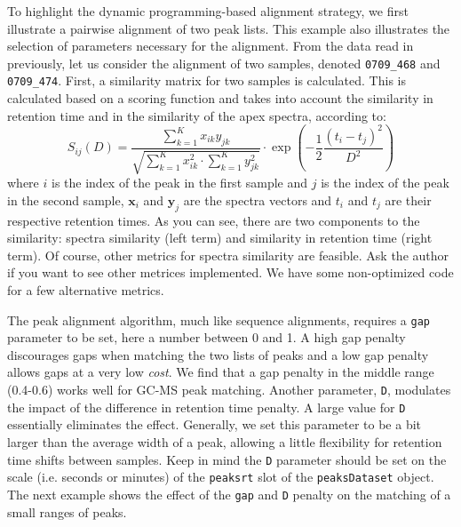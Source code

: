 \documentclass{article}\usepackage[]{graphicx}\usepackage[]{color}
\begin{document}
To highlight the dynamic programming-based alignment strategy, we
first illustrate a pairwise alignment of two peak lists. This example
also illustrates the selection of parameters necessary for the
alignment. From the data read in previously, let us consider the
alignment of two samples, denoted \texttt{0709\_468} and
\texttt{0709\_474}. First, a similarity matrix for two samples is
calculated. This is calculated based on a scoring function and takes
into account the similarity in retention time and in the similarity of
the apex spectra, according to: 
\[
S_{ij}(D) = \frac{\sum_{k=1}^K x_{ik} y_{jk}}{\sqrt{ \sum_{k=1}^K
    x_{ik}^2 \cdot \sum_{k=1}^K y_{jk}^2 } } \cdot \exp \left( -
  \frac{1}{2} \frac{(t_i-t_j)^2}{D^2} \right) 
\]
\noindent where $i$ is the index of the peak in the first sample and
$j$ is the index of the peak in the second sample, $\mathbf{x}_i$ and
$\mathbf{y}_j$ are the spectra vectors and $t_i$ and $t_j$ are their
respective retention times. As you can see, there are two components
to the similarity: spectra similarity (left term) and similarity in
retention time (right term). Of course, other metrics for spectra
similarity are feasible. Ask the author if you want to see other
metrices implemented. We have some non-optimized code for a few
alternative metrics. 

The peak alignment algorithm, much like sequence alignments, requires
a \texttt{gap} parameter to be set, here a number between 0 and 1.  A
high gap penalty discourages gaps when matching the two lists of peaks
and a low gap penalty allows gaps at a very low {\em cost}.  We find
that a gap penalty in the middle range (0.4-0.6) works well for GC-MS
peak matching.  Another parameter, \texttt{D}, modulates the impact of
the difference in retention time penalty. A large value for
\texttt{D} essentially eliminates the effect. Generally, we set this
parameter to be a bit larger than the average width of a peak,
allowing a little flexibility for retention time shifts between
samples. Keep in mind the \texttt{D} parameter should be set on the
scale (i.e. seconds or minutes) of the \texttt{peaksrt} slot of the
\texttt{peaksDataset} object. The next example shows the effect of
the \texttt{gap} and \texttt{D} penalty on the matching of a small
ranges of peaks. 
\end{document}
